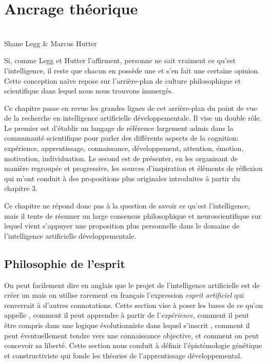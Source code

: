 \chapter{Ancrage théorique}

\noindent 

\begin{flushright}
\og {} \fg\ \\ 
	Shane Legg \& Marcus Hutter \cite[p.~1]{legg_universal_2007}
\end{flushright}

\noindent
Si, comme Legg et Hutter l'affirment, personne ne sait vraiment ce qu'est l'intelligence, il reste que chacun en possède une et s'en fait une certaine opinion. 
Cette conception naïve repose sur l'arrière-plan de culture philosophique et scientifique dans lequel nous nous trouvons immergés. 

Ce chapitre passe en revue les grandes lignes de cet arrière-plan du point de vue de la recherche en intelligence artificielle développementale. 
Il vise un double rôle. 
Le premier est d'établir un langage de référence largement admis dans la communauté scientifique pour parler des différents aspects de la cognition: expérience, apprentissage, connaissance, développement, attention, émotion, motivation, individuation. 
Le second est de présenter, en les organisant de manière regroupée et progressive, les sources d'inspiration et éléments de réflexion qui m'ont conduit à des propositions plus originales introduites à partir du chapitre 3.  

Ce chapitre ne répond donc pas à la question de savoir ce qu'est l'intelligence, mais il tente de résumer un large consensus philosophique et neuroscientifique sur lequel vient s'appuyer une proposition plus personnelle dans le domaine de l'intelligence artificielle développementale. 


\section{Philosophie de l'esprit}
\label{sec:philosophie}


\noindent
On peut facilement dire en anglais que le projet de l'intelligence artificielle est de créer un  mais on utilise rarement en français l'expression \emph{esprit artificiel} qui renverrait à d'autres connotations. 
Cette section vise à poser les bases de ce qu'on appelle , comment il peut apprendre à partir de l'\emph{expérience}, comment il peut être compris dans une logique évolutionniste dans lequel s'inscrit , comment il peut éventuellement tendre vers une connaissance objective, et comment on peut concevoir sa liberté.   
Cette section nous conduit à définir l'épistémologie génétique et constructiviste qui fonde les théories de l'apprentissage développemental. 


